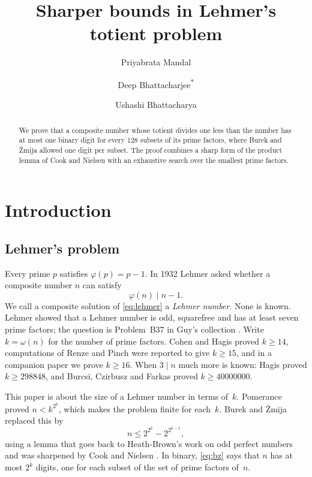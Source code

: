 \documentclass[11pt,reqno]{amsart}
\title[Sharper bounds in Lehmer's totient problem]
{Sharper bounds in Lehmer's totient problem}
\author[P. Mandal]{Priyabrata Mandal}
\author[D. Bhattacharjee]{Deep Bhattacharjee\textsuperscript{*}}
\author[U. Bhattacharya]{Ushashi Bhattacharya}
\date{}
\numberwithin{equation}{section}
\theoremstyle{plain}
\theoremstyle{definition}
\theoremstyle{remark}
\begin{document}
\begin{abstract}
We prove that a composite number whose totient divides one less than
the number has at most one binary digit for every 128 subsets of its
prime factors, where Burek and \.Zmija allowed one digit per subset.
The proof combines a sharp form of the product lemma of Cook and
Nielsen with an exhaustive search over the smallest prime factors.
\end{abstract}

\maketitle

\section{Introduction}\label{sec:intro}

\subsection{Lehmer's problem}
Every prime $p$ satisfies $\varphi(p)=p-1$. In 1932 Lehmer \cite{Leh32}
asked whether a composite number $n$ can satisfy
\begin{equation}\label{eq:lehmer}
  \varphi(n)\mid n-1 .
\end{equation}
We call a composite solution of \eqref{eq:lehmer} a \emph{Lehmer
number}. None is known. Lehmer showed that a Lehmer number is odd,
squarefree and has at least seven prime factors; the question is
Problem~B37 in Guy's collection \cite{Guy04}. Write $k=\omega(n)$ for
the number of prime factors. Cohen and Hagis \cite{CH80} proved
$k\ge14$, computations of Renze \cite{Ren04} and Pinch \cite{Pin06}
were reported to give $k\ge15$, and in a companion paper \cite{MBB}
we prove $k\ge16$. When $3\mid n$ much more is known: Hagis
\cite{Hag88} proved $k\ge298848$, and Burcsi, Czirbusz and Farkas
\cite{BCF11} proved $k\ge40000000$.

This paper is about the size of a Lehmer number in terms of~$k$.
Pomerance \cite{Pom77} proved $n<k^{2^k}$, which makes the problem
finite for each~$k$. Burek and \.Zmija \cite{BZ19} replaced this by
\begin{equation}\label{eq:bz}
  n\le 2^{2^k}-2^{2^{k-1}},
\end{equation}
using a lemma that goes back to Heath-Brown's work on odd perfect
numbers \cite{HB94} and was sharpened by Cook \cite{Coo99} and Nielsen
\cite{Nie03}. In binary, \eqref{eq:bz} says that $n$ has at most $2^k$
digits, one for each subset of the set of prime factors of~$n$.
\end{document}
